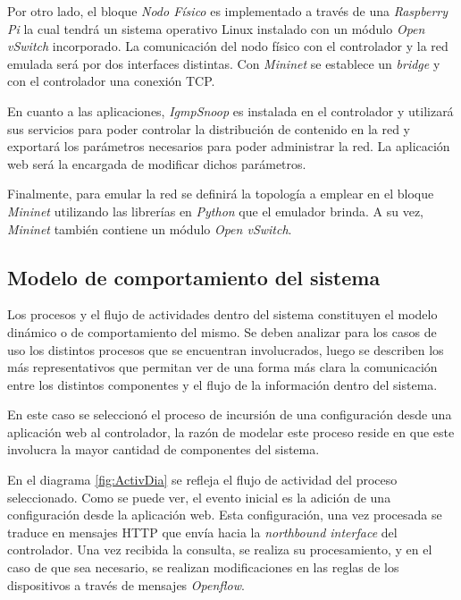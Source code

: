 Por otro lado, el bloque \textit{Nodo Físico} es implementado a través de una \textit{Raspberry Pi} la cual tendrá un sistema operativo Linux instalado con un módulo \textit{Open vSwitch} incorporado. La comunicación del nodo físico con el controlador y la red emulada será por dos interfaces distintas. Con \textit{Mininet} se establece un \textit{bridge} y con el controlador una conexión TCP.

En cuanto a las aplicaciones, \textit{IgmpSnoop} es instalada en el controlador y utilizará sus servicios para poder controlar la distribución de contenido en la red y exportará los parámetros necesarios para poder administrar la red. La aplicación web será la encargada de modificar dichos parámetros.

Finalmente, para emular la red se definirá la topología a emplear en el bloque \textit{Mininet} utilizando las librerías en \textit{Python} que el emulador brinda. A su vez, \textit{Mininet} también contiene un módulo \textit{Open vSwitch}.  


\subsection{Modelo de comportamiento del sistema}

Los procesos y el flujo de actividades dentro del sistema constituyen el modelo dinámico o de comportamiento del mismo. Se deben analizar para los casos 
de uso los distintos procesos que se encuentran involucrados, luego se describen los más representativos que permitan ver de una forma más clara la
 comunicación entre los distintos componentes y el flujo de la información dentro del sistema. \

En este caso se seleccionó el proceso de incursión de una configuración desde una aplicación web al controlador, la razón de modelar este proceso reside en que 
este involucra la mayor cantidad de componentes del sistema. \

En el diagrama \ref{fig:ActivDia} se refleja el flujo de actividad del proceso seleccionado. Como se puede ver, el evento inicial es la adición de una configuración desde 
la aplicación web. Esta configuración, una vez procesada se traduce en mensajes HTTP que envía hacia la \textit{northbound interface}
del controlador. Una vez recibida la consulta, se realiza su procesamiento, y en el caso de que sea necesario, se 
realizan modificaciones en las reglas de los dispositivos a través de mensajes \textit{Openflow}. \

